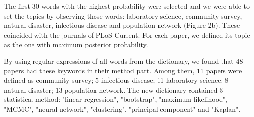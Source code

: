 \documentclass[11pt]{article}
\begin{document}
The first 30 words with the highest probability were selected and we were able to set the topics by observing those words: laboratory science, community survey, natural disaster, infectious disease and population network (Figure 2b). These coincided with the journals of PLoS Current. For each paper, we defined its topic as the one with maximum posterior probability.

By using regular expressions of all words from the dictionary, we found that 48 papers had these keywords in their method part. Among them, 11 papers were defined as community survey; 5 infectious disease; 11 laboratory science; 8 natural disaster; 13 population network. The new dictionary contained 8 statistical method: "linear regression", "bootstrap", "maximum likelihood", "MCMC", "neural network", "clustering", "principal component" and "Kaplan".
\end{document}
